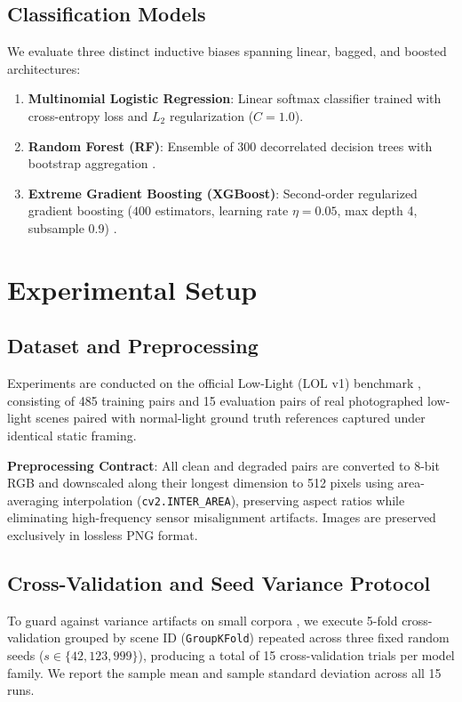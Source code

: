 \documentclass[journal]{IEEEtran}
\begin{document}
\subsection{Classification Models}
We evaluate three distinct inductive biases spanning linear, bagged, and boosted architectures:
\begin{enumerate}
    \item \textbf{Multinomial Logistic Regression}: Linear softmax classifier trained with cross-entropy loss and $L_2$ regularization ($C=1.0$).
    \item \textbf{Random Forest (RF)}: Ensemble of 300 decorrelated decision trees with bootstrap aggregation \cite{breiman2001random}.
    \item \textbf{Extreme Gradient Boosting (XGBoost)}: Second-order regularized gradient boosting ($400$ estimators, learning rate $\eta=0.05$, max depth 4, subsample 0.9) \cite{chen2016xgboost}.
\end{enumerate}

\section{Experimental Setup}

\subsection{Dataset and Preprocessing}
Experiments are conducted on the official Low-Light (LOL v1) benchmark \cite{wei2018deep}, consisting of 485 training pairs and 15 evaluation pairs of real photographed low-light scenes paired with normal-light ground truth references captured under identical static framing.

\textbf{Preprocessing Contract}: All clean and degraded pairs are converted to 8-bit RGB and downscaled along their longest dimension to 512 pixels using area-averaging interpolation (\texttt{cv2.INTER\_AREA}), preserving aspect ratios while eliminating high-frequency sensor misalignment artifacts. Images are preserved exclusively in lossless PNG format.

\subsection{Cross-Validation and Seed Variance Protocol}
To guard against variance artifacts on small corpora \cite{bouthillier2021accounting}, we execute 5-fold cross-validation grouped by scene ID (\texttt{GroupKFold}) repeated across three fixed random seeds ($s \in \{42, 123, 999\}$), producing a total of 15 cross-validation trials per model family. We report the sample mean and sample standard deviation across all 15 runs.
\end{document}
